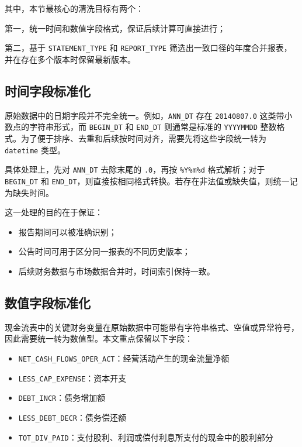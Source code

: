 \documentclass[a4paper,10pt]{article}
\begin{document}
其中，本节最核心的清洗目标有两个：

第一，统一时间和数值字段格式，保证后续计算可直接进行；

第二，基于 \texttt{STATEMENT\_TYPE} 和 \texttt{REPORT\_TYPE} 筛选出一致口径的年度合并报表，并在存在多个版本时保留最新版本。

\subsection{时间字段标准化}

原始数据中的日期字段并不完全统一。例如，\texttt{ANN\_DT} 存在 \texttt{20140807.0} 这类带小数点的字符串形式，而 \texttt{BEGIN\_DT} 和 \texttt{END\_DT} 则通常是标准的 \texttt{YYYYMMDD} 整数格式。为了便于排序、去重和后续按时间对齐，需要先将这些字段统一转为 \texttt{datetime} 类型。

具体处理上，先对 \texttt{ANN\_DT} 去除末尾的 \texttt{.0}，再按 \texttt{\%Y\%m\%d} 格式解析；对于 \texttt{BEGIN\_DT} 和 \texttt{END\_DT}，则直接按相同格式转换。若存在非法值或缺失值，则统一记为缺失时间。

这一处理的目的在于保证：
\begin{itemize}
    \item 报告期间可以被准确识别；
    \item 公告时间可用于区分同一报表的不同历史版本；
    \item 后续财务数据与市场数据合并时，时间索引保持一致。
\end{itemize}


\subsection{数值字段标准化}

现金流表中的关键财务变量在原始数据中可能带有字符串格式、空值或异常符号，因此需要统一转为数值型。本文重点保留以下字段：

\begin{itemize}
    \item \texttt{NET\_CASH\_FLOWS\_OPER\_ACT}：经营活动产生的现金流量净额
    \item \texttt{LESS\_CAP\_EXPENSE}：资本开支
    \item \texttt{DEBT\_INCR}：债务增加额
    \item \texttt{LESS\_DEBT\_DECR}：债务偿还额
    \item \texttt{TOT\_DIV\_PAID}：支付股利、利润或偿付利息所支付的现金中的股利部分
\end{itemize}
\end{document}
